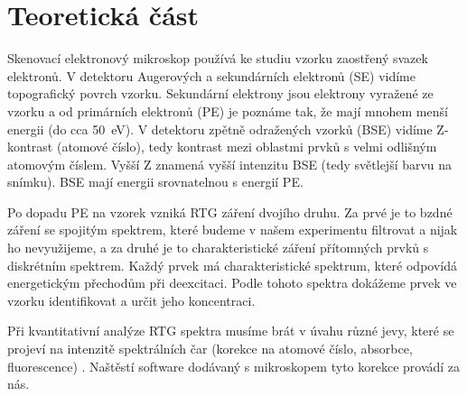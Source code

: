 \section*{Teoretická část}
Skenovací elektronový mikroskop používá ke studiu vzorku zaostřený svazek elektronů.
V detektoru Augerových a sekundárních elektronů (SE) vidíme topografický povrch vzorku. Sekundární elektrony jsou elektrony vyražené ze vzorku a od primárních elektronů (PE) je poznáme tak, že mají mnohem menší energii (do cca \SI{50}{\eV}).
V detektoru zpětně odražených vzorků (BSE) vidíme Z-kontrast (atomové číslo), tedy kontrast mezi oblastmi prvků s velmi odlišným atomovým číslem. Vyšší Z znamená vyšší intenzitu BSE (tedy světlejší barvu na snímku). BSE mají energii srovnatelnou s energií PE.

Po dopadu PE na vzorek vzniká RTG záření dvojího druhu. Za prvé je to bzdné záření se spojitým spektrem, které budeme v našem experimentu filtrovat a nijak ho nevyužijeme, a za druhé je to charakteristické záření přítomných prvků s diskrétním spektrem. Každý prvek má charakteristické spektrum, které odpovídá energetickým přechodům při deexcitaci. Podle tohoto spektra dokážeme prvek ve vzorku identifikovat a určit jeho koncentraci.

Při kvantitativní analýze RTG spektra musíme brát v úvahu různé jevy, které se projeví na intenzitě spektrálních čar (korekce na atomové číslo, absorbce, fluorescence) \cite{skripta}. Naštěstí software dodávaný s mikroskopem tyto korekce provádí za nás.